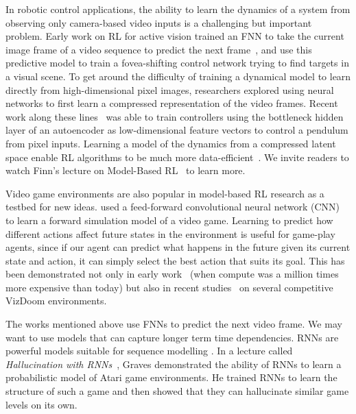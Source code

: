 \documentclass{article}
\begin{document}
In robotic control applications, the ability to learn the dynamics of a system from observing only camera-based video inputs is a challenging but important problem. Early work on RL for active vision trained an FNN to take the current image frame of a video sequence to predict the next frame~\cite{s04_trajectories}, and use this predictive model to train a fovea-shifting control network trying to find targets in a visual scene. To get around the difficulty of training a dynamical model to learn directly from high-dimensional pixel images, researchers explored using neural networks to first learn a compressed representation of the video frames.  Recent work along these lines~\cite{learning_deep_dynamical_models_from_image_pixels,from_pixels_to_torques} was able to train controllers using the bottleneck hidden layer of an autoencoder as low-dimensional feature vectors to control a pendulum from pixel inputs. Learning a model of the dynamics from a compressed latent space enable RL algorithms to be much more data-efficient~\cite{deep_spacial_autoencoders,embed_to_control,finn_lecture}. We invite readers to watch Finn's lecture on Model-Based RL~\cite{finn_lecture} to learn more.

Video game environments are also popular in model-based RL research as a testbed for new ideas. \cite{game_engine_learning} used a feed-forward convolutional neural network (CNN) to learn a forward simulation model of a video game. Learning to predict how different actions affect future states in the environment is useful for game-play agents, since if our agent can predict what happens in the future given its current state and action, it can simply select the best action that suits its goal. This has been demonstrated not only in early work~\cite{NguyenWidrow89,s04_trajectories} (when compute was a million times more expensive than today) but also in recent studies~\cite{learn_to_act_by_predicting_future} on several competitive VizDoom environments.

The works mentioned above use FNNs to predict the next video frame. We may want to use models that can capture longer term time dependencies. RNNs are powerful models suitable for sequence modelling \cite{graves_rnn}. In a lecture called \textit{Hallucination with RNNs}~\cite{graves_lecture}, Graves demonstrated the ability of RNNs to learn a probabilistic model of Atari game environments. He trained RNNs to learn the structure of such a game and then showed that they can hallucinate similar game levels on its own.
\end{document}
